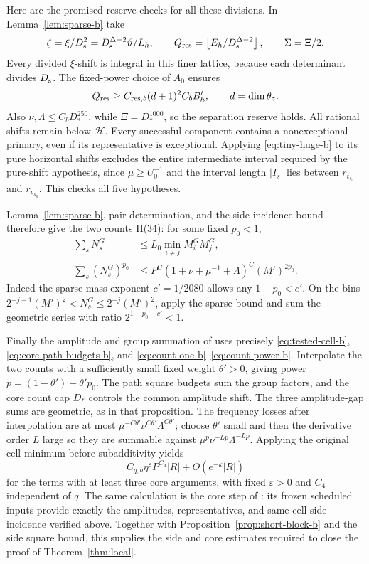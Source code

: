 Here are the promised reserve checks for all these divisions.  In
Lemma~\ref{lem:sparse-b} take
\[
 \zeta=\xi/D_{\rm s}^2
       =D_{\rm s}^{\Delta-2}\vartheta/L_h,\qquad
 Q_{\rm res}=\left\lfloor E_h/D_{\rm s}^{\Delta-2}\right\rfloor,
 \qquad \Sigma=\Xi/2.
\]
Every divided \(\xi\)-shift is integral in this finer lattice,
because each determinant divides \(D_{\rm s}\).
The fixed-power choice of \(A_0\) ensures
\[
 Q_{\rm res}\ge
 C_{{\rm res},b}(d+1)^2C_bB'_h,
 \qquad d=\dim\theta_z.
\]
Also \(\nu,\Lambda\le C_bD_*^{250}\), while
\(\Xi=D_*^{1000}\), so the separation reserve holds.  All
rational shifts remain below \(\mathcal H\).
Every successful component contains a nonexceptional primary,
even if its representative is exceptional.  Applying
\eqref{eq:tiny-huge-b} to its pure horizontal shifts excludes the
entire intermediate interval required by the pure-shift hypothesis,
since \(\mu\ge U_0^{-1}\) and the interval length \(|I_s|\) lies
between \(r_{t_{s_0}}\) and \(r_{v_{s_0}}\).  This checks all five hypotheses.

Lemma~\ref{lem:sparse-b}, pair determination, and the side incidence
bound therefore give the two counts H(34): for some fixed
\(p_0<1\),
\begin{align}
 \sum_sN_s^G&\le L_0\min_{i\ne j}M_i^GM_j^G,\label{eq:count-one-b}\\
 \sum_s(N_s^G)^{p_0}
 &\le P^C(1+\nu+\mu^{-1}+\Lambda)^C(M')^{2p_0}.
 \label{eq:count-power-b}
\end{align}
Indeed the sparse-mass exponent \(c'=1/2080\) allows any
\(1-p_0<c'\).  On the bins
\(2^{-j-1}(M')^2<N_s^G\le2^{-j}(M')^2\), apply the sparse
bound and sum the geometric series with ratio
\(2^{1-p_0-c'}<1\).

Finally the amplitude and group summation of
\cite[Proposition~9.3]{H} uses precisely
\eqref{eq:tested-cell-b}, \eqref{eq:core-path-budgets-b}, and
\eqref{eq:count-one-b}--\eqref{eq:count-power-b}.  Interpolate the
two counts with a sufficiently small fixed weight \(\theta'>0\),
giving power \(p=(1-\theta')+\theta'p_0\).  The path square
budgets sum the group factors, and the core count cap \(D_*\)
controls the common amplitude shift.  The three amplitude-gap sums
are geometric, as in that proposition.  The frequency losses after
interpolation are at most
\(\mu^{-C\theta'}\nu^{C\theta'}\Lambda^{C\theta'}\);
choose \(\theta'\) small and then the derivative order \(L\)
large so they are summable against
\(\mu^p\nu^{-Lp}\Lambda^{-Lp}\).
Applying the original cell minimum before subadditivity yields
\begin{equation}\label{eq:core-final-b}
 C_{q,b}\eta^{\varepsilon}P^{C_4}|R|+O(e^{-k}|R|)
\end{equation}
for the terms with at least three core arguments, with fixed
\(\varepsilon>0\) and \(C_4\) independent of \(q\).
The same calculation is the core step of \cite[Section~6.6]{V}:
its frozen scheduled inputs provide exactly the amplitudes,
representatives, and same-cell side incidence verified above.
Together with Proposition~\ref{prop:short-block-b} and the side
square bound, this supplies the side and core estimates required
to close the proof of Theorem~\ref{thm:local}.
